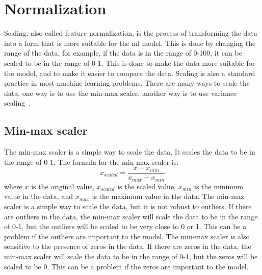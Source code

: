 \section{Normalization}\label{sec:normalization}
Scaling, also called feature normalization, is the process of transforming the data into a form that is more suitable for the \gls{ml} model. This is done by changing the range of the data, for example, if the data is in the range of 0-100, it can be scaled to be in the range of 0-1. This is done to make the data more suitable for the model, and to make it easier to compare the data. Scaling is also a standard practice in most machine learning problems. There are many ways to scale the data, one way is to use the min-max scaler, another way is to use variance scaling~\cite{Feature-engineering-zheng}.
\subsection{Min-max scaler}
The min-max scaler is a simple way to scale the data. It scales the data to be in the range of 0-1. The formula for the min-max scaler is:
\begin{equation}
    x_{scaled} = \frac{x - x_{min}}{x_{max} - x_{min}}
\end{equation}
where $x$ is the original value, $x_{scaled}$ is the scaled value, $x_{min}$ is the minimum value in the data, and $x_{max}$ is the maximum value in the data. The min-max scaler is a simple way to scale the data, but it is not robust to outliers. If there are outliers in the data, the min-max scaler will scale the data to be in the range of 0-1, but the outliers will be scaled to be very close to 0 or 1. This can be a problem if the outliers are important to the model. The min-max scaler is also sensitive to the presence of zeros in the data. If there are zeros in the data, the min-max scaler will scale the data to be in the range of 0-1, but the zeros will be scaled to be 0. This can be a problem if the zeros are important to the model. 

